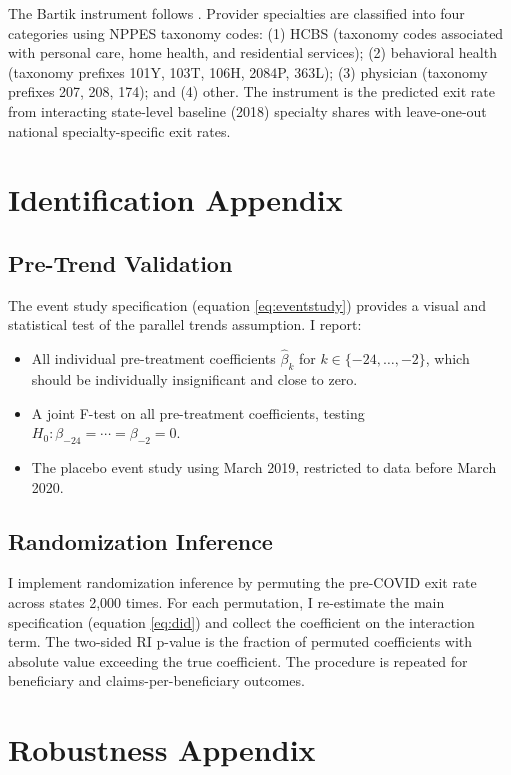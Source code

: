 \documentclass[12pt]{article}
\begin{document}
The Bartik instrument follows \citet{goldsmithpinkham2020}. Provider specialties are classified into four categories using NPPES taxonomy codes: (1) HCBS (taxonomy codes associated with personal care, home health, and residential services); (2) behavioral health (taxonomy prefixes 101Y, 103T, 106H, 2084P, 363L); (3) physician (taxonomy prefixes 207, 208, 174); and (4) other. The instrument is the predicted exit rate from interacting state-level baseline (2018) specialty shares with leave-one-out national specialty-specific exit rates.

\section{Identification Appendix}

\subsection{Pre-Trend Validation}

The event study specification (equation \ref{eq:eventstudy}) provides a visual and statistical test of the parallel trends assumption. I report:
\begin{itemize}
\item All individual pre-treatment coefficients $\hat{\beta}_k$ for $k \in \{-24, \ldots, -2\}$, which should be individually insignificant and close to zero.
\item A joint F-test on all pre-treatment coefficients, testing $H_0: \beta_{-24} = \cdots = \beta_{-2} = 0$.
\item The placebo event study using March 2019, restricted to data before March 2020.
\end{itemize}

\subsection{Randomization Inference}

I implement randomization inference by permuting the pre-COVID exit rate across states 2,000 times. For each permutation, I re-estimate the main specification (equation \ref{eq:did}) and collect the coefficient on the interaction term. The two-sided RI p-value is the fraction of permuted coefficients with absolute value exceeding the true coefficient. The procedure is repeated for beneficiary and claims-per-beneficiary outcomes.

\section{Robustness Appendix}
\end{document}
